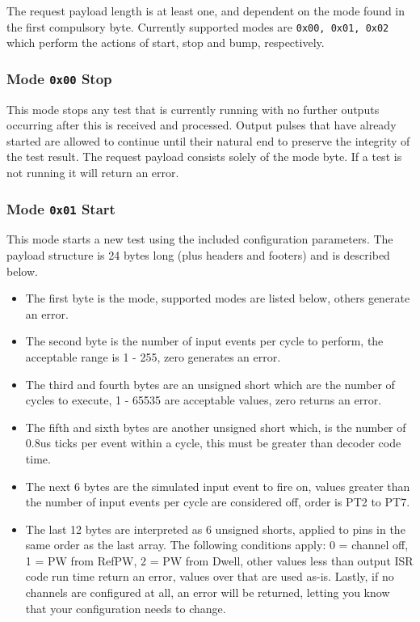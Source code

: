 \documentclass[12pt,a4paper,titlepage]{article}
\begin{document}
\begin{titlepage}
\begin{center}
The request payload length is at least one, and dependent on the mode found in the first compulsory byte. Currently supported modes are \texttt{0x00, 0x01, 0x02} which perform the actions of start, stop and bump, respectively.

\subsubsection{Mode \texttt{0x00} Stop}

This mode stops any test that is currently running with no further outputs occurring after this is received and processed. Output pulses that have already started are allowed to continue until their natural end to preserve the integrity of the test result. The request payload consists solely of the mode byte. If a test is not running it will return an error.

\subsubsection{Mode \texttt{0x01} Start}

This mode starts a new test using the included configuration parameters. The payload structure is 24 bytes long (plus headers and footers) and is described below.

\begin{itemize}
\item The first byte is the mode, supported modes are listed below, others generate an error.
\item The second byte is the number of input events per cycle to perform, the acceptable range is 1 - 255, zero generates an error.
\item The third and fourth bytes are an unsigned short which are the number of cycles to execute, 1 - 65535 are acceptable values, zero returns an error.
\item The fifth and sixth bytes are another unsigned short which, is the number of 0.8us ticks per event within a cycle, this must be greater than decoder code time.
\item The next 6 bytes are the simulated input event to fire on, values greater than the number of input events per cycle are considered off, order is PT2 to PT7.
\item The last 12 bytes are interpreted as 6 unsigned shorts, applied to pins in the same order as the last array. The following conditions apply: 0 = channel off, 1 = PW from RefPW, 2 = PW from Dwell, other values less than output ISR code run time return an error, values over that are used as-is. Lastly, if no channels are configured at all, an error will be returned, letting you know that your configuration needs to change.
\end{itemize}


\end{center}
\end{titlepage}
\end{document}
